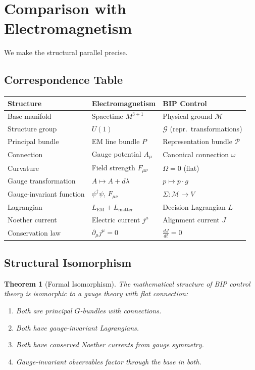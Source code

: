 \documentclass[11pt]{article}
\newtheorem{theorem}{Theorem}[section]
\begin{document}
\section{Comparison with Electromagnetism}

We make the structural parallel precise.

\subsection{Correspondence Table}

\begin{table}[h]
\centering
\begin{tabular}{@{}lll@{}}
\toprule
\textbf{Structure} & \textbf{Electromagnetism} & \textbf{BIP Control} \\
\midrule
Base manifold & Spacetime $M^{3+1}$ & Physical ground $\mathcal{M}$ \\
Structure group & $U(1)$ & $\mathcal{G}$ (repr.\ transformations) \\
Principal bundle & EM line bundle $P$ & Representation bundle $\mathcal{P}$ \\
Connection & Gauge potential $A_\mu$ & Canonical connection $\omega$ \\
Curvature & Field strength $F_{\mu\nu}$ & $\Omega = 0$ (flat) \\
Gauge transformation & $A \mapsto A + d\lambda$ & $p \mapsto p \cdot g$ \\
Gauge-invariant function & $\psi^\dagger\psi$, $F_{\mu\nu}$ & $\Sigma : \mathcal{M} \to V$ \\
Lagrangian & $L_{\mathrm{EM}} + L_{\mathrm{matter}}$ & Decision Lagrangian $L$ \\
Noether current & Electric current $j^\mu$ & Alignment current $J$ \\
Conservation law & $\partial_\mu j^\mu = 0$ & $\frac{dJ}{dt} = 0$ \\
\bottomrule
\end{tabular}
\end{table}

\subsection{Structural Isomorphism}

\begin{theorem}[Formal Isomorphism]
The mathematical structure of BIP control theory is
isomorphic to a gauge theory with flat connection:
\begin{enumerate}
    \item[(i)] Both are principal $G$-bundles with connections.
    \item[(ii)] Both have gauge-invariant Lagrangians.
    \item[(iii)] Both have conserved Noether currents from gauge symmetry.
    \item[(iv)] Gauge-invariant observables factor through the base in both.
\end{enumerate}
\end{theorem}
\end{document}
